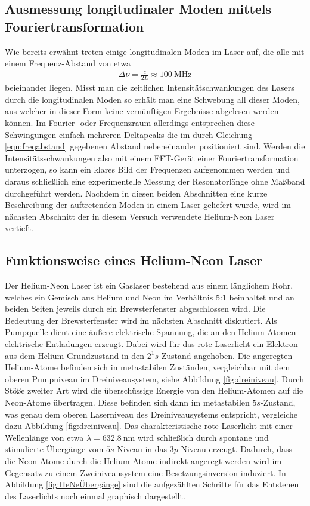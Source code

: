 \subsection{Ausmessung longitudinaler Moden mittels Fouriertransformation}
\label{sec:long}

Wie bereits erwähnt treten einige longitudinalen Moden im Laser auf, die alle mit einem Frequenz-Abstand von etwa
\begin{align}
  \Delta \nu = \frac{c}{2 L} \approx \SI{100}{\mega\hertz}
  \label{eqn:freqabstand}
\end{align}
beieinander liegen. Misst man die zeitlichen Intensitätschwankungen des Lasers durch die longitudinalen Moden
so erhält man eine Schwebung all dieser Moden, aus welcher in dieser Form keine vernünftigen Ergebnisse
abgelesen werden können. Im Fourier- oder Frequenzraum allerdings entsprechen diese Schwingungen einfach
mehreren Deltapeaks die im durch Gleichung \eqref{eqn:freqabstand} gegebenen Abstand nebeneinander positioniert sind.
Werden die Intensitätsschwankungen also mit einem FFT-Gerät einer Fouriertransformation unterzogen, so kann
ein klares Bild der Frequenzen aufgenommen werden und daraus schließlich eine experimentelle Messung der
Resonatorlänge ohne Maßband durchgeführt werden.
Nachdem in diesen beiden Abschnitten eine kurze Beschreibung der auftretenden Moden in einem Laser geliefert wurde,
wird im nächsten Abschnitt der in diesem Versuch verwendete Helium-Neon Laser vertieft.

\subsection{Funktionsweise eines Helium-Neon Laser}

Der Helium-Neon Laser ist ein Gaslaser bestehend aus einem länglichem Rohr, welches ein Gemisch aus Helium und Neon
im Verhältnis 5:1 beinhaltet und an beiden Seiten jeweils durch ein Brewsterfenster abgeschlossen wird.
Die Bedeutung der Brewsterfenster wird im nächsten Abschnitt diskutiert. Als Pumpquelle dient eine äußere
elektrische Spannung, die an den Helium-Atomen elektrische Entladungen erzeugt. Dabei wird für das rote
Laserlicht ein Elektron aus dem Helium-Grundzustand in den $2^1 s$-Zustand angehoben. Die angeregten Helium-Atome
befinden sich in metastabilen Zuständen, vergleichbar mit dem oberen Pumpniveau im Dreiniveausystem, siehe Abbildung
\ref{fig:dreiniveau}. Durch Stöße zweiter Art wird die überschüssige Energie von den Helium-Atomen auf die
Neon-Atome übertragen. Diese befinden sich dann im metastabilen $5s$-Zustand, was genau dem oberen
Laserniveau des Dreiniveausystems entspricht, vergleiche dazu Abbildung \ref{fig:dreiniveau}.
Das charakteristische rote Laserlicht mit einer Wellenlänge von etwa $\lambda = \SI{632,8}{\nano\meter}$
wird schließlich durch spontane und stimulierte Übergänge vom $5s$-Niveau in das $3p$-Niveau erzeugt.
Dadurch, dass die Neon-Atome durch die Helium-Atome indirekt angeregt werden wird im Gegensatz zu einem
Zweiniveausystem eine Besetzungsinversion induziert. In Abbildung \ref{fig:HeNeÜbergänge} sind die
aufgezählten Schritte für das Entstehen des Laserlichts noch einmal graphisch dargestellt.

